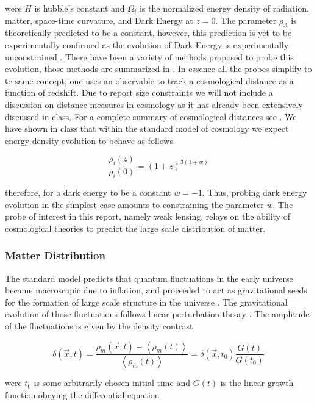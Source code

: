 were $H$ is hubble's constant and $\Omega_i$ is the normalized energy density of radiation, matter, space-time curvature, and Dark Energy at $z=0$. The parameter $\rho_\Lambda$ is theoretically predicted to be a constant, however, this prediction is yet to be experimentally confirmed as the evolution of Dark Energy is experimentally unconstrained \cite{general_2013}. There have been a variety of methods proposed to probe this evolution, those methods are summarized in \cite{eisen,general_2013}. In essence all the probes simplify to te same concept; one uses an observable to track a cosmological distance as a function of redshift. Due to report size constraints we will not include a discussion on distance measures in cosmology as it has already been extensively discussed in class. For a complete summary of cosmological distances see \cite{Hogg:1999ad}. We have shown in class that within the standard model of cosmology we expect energy density evolution to behave as follows

\begin{equation}
  \frac{\rho_i(z)}{\rho_i(0)} = (1+z)^{3(1+w)}
  \label{eq:densevol}
\end{equation}

therefore, for a dark energy to be a constant $w=-1$. Thus, probing dark energy evolution in the simplest case amounts to constraining the parameter $w$. The probe of interest in this report, namely weak lensing, relays on the ability of cosmological theories to predict the large scale distribution of matter.

\subsubsection{Matter Distribution}
The standard model predicts that quantum fluctuations in the early universe became macroscopic due to inflation, and proceeded to act as gravitational seeds for the formation of large scale structure in the universe \cite{extragalactic,general_2013,ryden}. The gravitational evolution of those fluctuations follows linear perturbation theory \cite{general_2013}. The amplitude of the fluctuations is given by the density contrast 

\begin{equation}
  \delta(\vec{x},t) = \frac{\rho_m(\vec{x},t)-\left<\rho_m(t)\right>}{\left<\rho_m(t)\right>} = \delta(\vec{x},t_0) \frac{G(t)}{G(t_0)}
  \label{eq:densitycontrast}
\end{equation}

were $t_0$ is some arbitrarily chosen initial time and $G(t)$ is the linear growth function obeying the differential equation 

